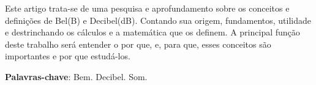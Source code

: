 \documentclass[
	article,			
	12pt,				
	oneside,			
	a4paper,						
	brazil,				
	sumario=tradicional
	]{abntex2}
\begin{document}
\frenchspacing 
\maketitle

\begin{resumoumacoluna}
    
	Este artigo trata-se de uma pesquisa e aprofundamento sobre os conceitos e definições de Bel(B) e Decibel(dB).
	Contando sua origem, fundamentos, utilidade e destrinchando os cálculos e a matemática que os definem. 
	A principal função deste trabalho será entender o por que, e, para que, esses conceitos são importantes 
	e por que estudá-los.
    
    \vspace{\onelineskip}
    
    \noindent
    \textbf{Palavras-chave}: Bem. Decibel. Som.
\end{resumoumacoluna}

\textual

\newpage





\newpage

\end{document}
